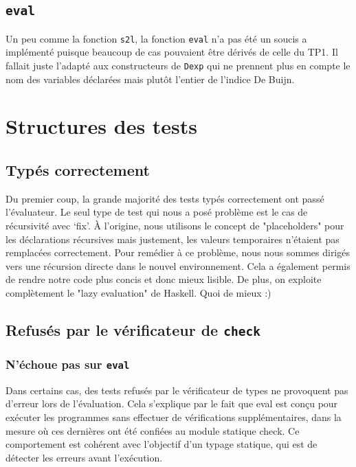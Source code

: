 \documentclass[a4paper,12pt]{article}
\begin{document}
    \subsection{\texttt{eval}}
        Un peu comme la fonction \texttt{s2l}, la fonction \texttt{eval} n'a pas été un soucis
        a implémenté puisque beaucoup de cas pouvaient être dérivés de celle du TP1. Il fallait 
        juste l'adapté aux constructeurs de \texttt{Dexp} qui ne prennent plus en compte le
        nom des variables déclarées mais plutôt l'entier de l'indice De Buijn.

\newpage
\section{Structures des tests}
    \subsection{Typés correctement}
        Du premier coup, la grande majorité des tests typés correctement
        ont passé l'évaluateur. Le seul type de test qui nous a posé
        problème est le cas de récursivité avec `fix'. À l'origine,
        nous utilisons le concept de "placeholders" pour les déclarations
        récursives mais justement, les valeurs temporaires n'étaient pas
        remplacées correctement. Pour remédier à ce problème, nous nous
        sommes dirigés vers une récursion directe dans le nouvel environnement.
        Cela a également permis de rendre notre code plus concis et donc
        mieux lisible. De plus, on exploite complètement le "lazy evaluation"
        de Haskell. Quoi de mieux :)
    \subsection{Refusés par le vérificateur de \texttt{check}}
        \subsubsection{N'échoue pas sur \texttt{eval}}
        Dans certains cas, des tests refusés par le vérificateur de types ne provoquent pas d'erreur 
        lors de l'évaluation. Cela s'explique par le fait que eval est conçu pour exécuter les programmes 
        sans effectuer de vérifications supplémentaires, dans la mesure où ces dernières ont été confiées 
        au module statique check. Ce comportement est cohérent avec l'objectif d'un typage statique, qui est de 
        détecter les erreurs avant l'exécution. \\
\end{document}
